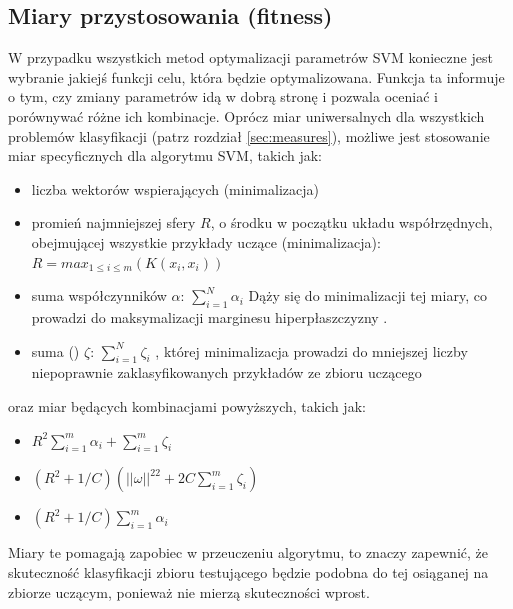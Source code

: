 \subsection{Miary przystosowania (fitness)} \label{ssec:alt-meassures}
W przypadku wszystkich metod optymalizacji parametrów SVM konieczne jest wybranie jakiejś funkcji celu, która będzie optymalizowana. Funkcja ta informuje o tym, czy zmiany parametrów idą w dobrą stronę i pozwala oceniać i porównywać różne ich kombinacje. Oprócz miar uniwersalnych dla wszystkich problemów klasyfikacji (patrz rozdział \ref{sec:measures}), możliwe jest stosowanie miar specyficznych dla algorytmu SVM, takich jak: \cite{howley_genetic_2005} \cite{runarsson_asynchronous_2004}
\begin{itemize}
	\item liczba wektorów wspierających (minimalizacja)
	\item promień najmniejszej sfery $ R $, o środku w początku układu współrzędnych, obejmującej wszystkie przykłady uczące (minimalizacja):
		$ R = max_{1 \leq i \leq m} (K(x_i, x_i))  $
	\item suma współczynników $ \alpha $: 
	$ \sum_{i=1}^N \alpha_i $
	Dąży się do minimalizacji tej miary, co prowadzi do maksymalizacji marginesu hiperpłaszczyzny \cite{howley_genetic_2005}.
	\item suma  () $ \zeta $:
	 $ \sum_{i=1}^N \zeta_i $
	 , której minimalizacja prowadzi do mniejszej liczby niepoprawnie zaklasyfikowanych przykładów ze zbioru uczącego
\end{itemize}
	oraz miar będących kombinacjami powyższych, takich jak: \cite{runarsson_asynchronous_2004}
\begin{itemize}
	\item $ R^2 \sum_{i=1}^m \alpha_i + \sum_{i=1}^m \zeta_i $
	\item $ (R^2 + 1/C) (||\omega||^22 + 2C \sum_{i=1}^m \zeta_i) $
	\item $ (R^2 + 1/C) \sum_{i=1}^m \alpha_i $
\end{itemize}
Miary te pomagają zapobiec w przeuczeniu algorytmu, to znaczy zapewnić, że skuteczność klasyfikacji zbioru testującego będzie podobna do tej osiąganej na zbiorze uczącym, ponieważ nie mierzą skuteczności wprost. 

